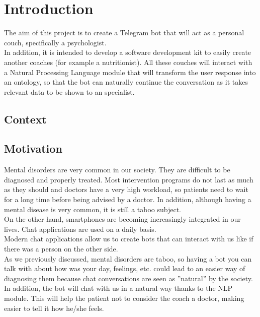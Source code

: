 \documentclass[12pt,english]{article}
\begin{document}


\thispagestyle{empty}
\newpage
\tableofcontents{}
\newpage
\listoffigures
\thispagestyle{empty}
\newpage

\section{Introduction}

The aim of this project is to create a Telegram bot that will act as a personal couch, specifically a psychologist.\\

In addition, it is intended to develop a software development kit to easily create another coaches (for example a nutritionist). All these couches will interact with a Natural Processing Language module that will transform the user response into an ontology, so that the bot can naturally continue the conversation as it takes relevant data to be shown to an specialist.

\subsection{Context}


\subsection{Motivation}

Mental disorders are very common in our society. They are difficult to be diagnosed and properly treated. Most intervention programs do not last as much as they should and doctors have a very high workload, so patients need to wait for a long time before being advised by a doctor. In addition, although having a mental disease is very common, it is still a taboo subject. \\

On the other hand, smartphones are becoming increasingly integrated in our lives. Chat applications are used on a daily basis.\\

Modern chat applications allow us to create bots that can interact with us like if there was a person on the other side.\\

As we previously discussed, mental disorders are taboo, so having a bot you can talk with about how was your day, feelings, etc. could lead to an easier way of diagnosing them because chat conversations are seen as ''natural'' by the society. In addition, the bot will chat with us in a natural way thanks to the NLP module. This will help the patient not to consider the coach a doctor, making easier to tell it how he/she feels.
\end{document}
